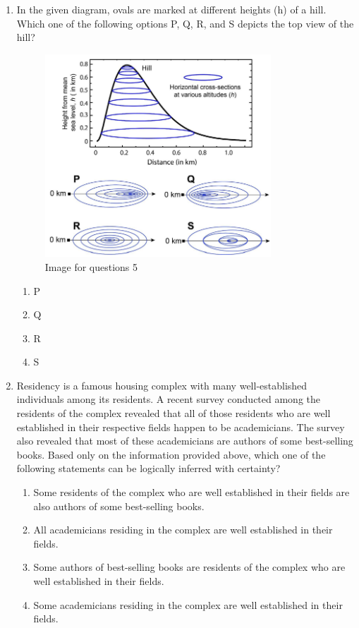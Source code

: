 \documentclass[journal,12pt,onecolumn]{IEEEtran}
\theoremstyle{remark}
\begin{document}
\begin{enumerate}
\item In the given diagram, ovals are marked at different heights (h) of a hill. Which one of the following options P, Q, R, and S depicts the top view of the hill?

\begin{figure}[H]
    \centering
    \includegraphics[width=0.8\textwidth]{figs/fig1.png}
    \caption{Image for questions 5}
    \label{fig:question5}
\end{figure}
\vspace{0.5cm}



\begin{enumerate}
\item P
\item Q
\item R
\item S
\end{enumerate}
\vspace{0.5cm}

\item Residency is a famous housing complex with many well-established individuals among its residents. A recent survey conducted among the residents of the complex revealed that all of those residents who are well established in their respective fields happen to be academicians. The survey also revealed that most of these academicians are authors of some best-selling books. Based only on the information provided above, which one of the following statements can be logically inferred with certainty?
\begin{enumerate}
\item Some residents of the complex who are well established in their fields are also authors of some best-selling books.
\item All academicians residing in the complex are well established in their fields.
\item Some authors of best-selling books are residents of the complex who are well established in their fields.
\item Some academicians residing in the complex are well established in their fields.
\end{enumerate}
\vspace{0.5cm}


\end{enumerate}
\end{document}
